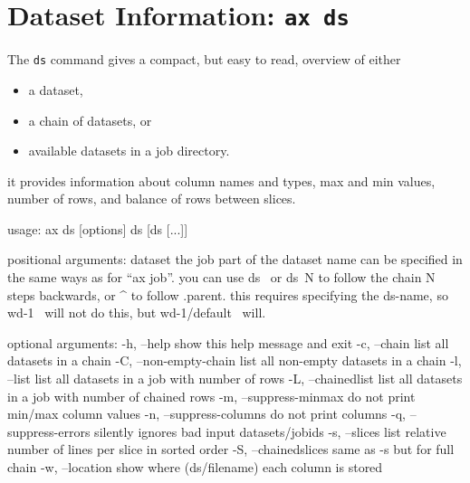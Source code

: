 \section{Dataset Information: \texttt{ax ds}}
The \texttt{ds} command gives a compact, but easy to read,
overview of either
\begin{itemize}
\item[] a dataset,
\item[] a chain of datasets, or
\item[] available datasets in a job directory.
\end{itemize}
it provides information about column names and types, max and min
values, number of rows, and balance of rows between slices.
\begin{shell}
  usage: ax ds [options] ds [ds [...]]

  positional arguments:
  dataset               the job part of the dataset name can be specified in
                        the same ways as for ``ax job''. you can use ds~ or
                        ds~N to follow the chain N steps backwards, or ^ to
                        follow .parent. this requires specifying the ds-name,
                        so wd-1~ will not do this, but wd-1/default~ will.

  optional arguments:
  -h, --help            show this help message and exit
  -c, --chain           list all datasets in a chain
  -C, --non-empty-chain
  list all non-empty datasets in a chain
  -l, --list            list all datasets in a job with number of rows
  -L, --chainedlist     list all datasets in a job with number of chained rows
  -m, --suppress-minmax
  do not print min/max column values
  -n, --suppress-columns
  do not print columns
  -q, --suppress-errors
  silently ignores bad input datasets/jobids
  -s, --slices          list relative number of lines per slice in sorted order
  -S, --chainedslices   same as -s but for full chain
  -w, --location        show where (ds/filename) each column is stored
\end{shell}

